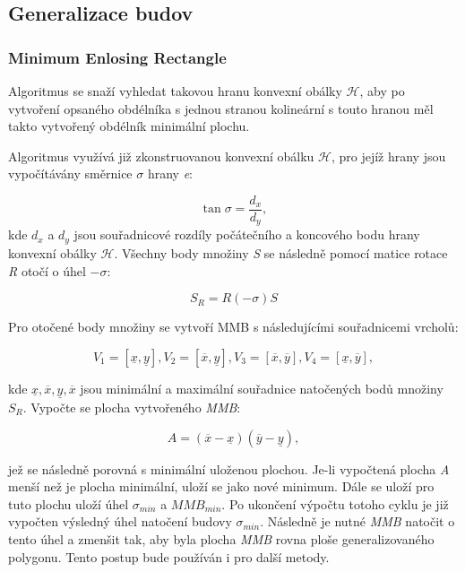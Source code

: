 \documentclass[11pt]{article}
\begin{document}
	
	\subsection{Generalizace budov}
	\subsubsection{Minimum Enlosing Rectangle}
	Algoritmus se snaží vyhledat takovou hranu konvexní obálky $\mathcal{H}$, aby po vytvoření opsaného obdélníka s jednou stranou kolineární s touto hranou měl takto vytvořený obdélník minimální plochu.
	
	Algoritmus využívá již zkonstruovanou konvexní obálku $\mathcal{H}$, pro jejíž hrany jsou vypočítávány směrnice $\sigma$ hrany \textit{e}: 
	
	\begin{equation}
		\tan\sigma=\frac{d_x}{d_y}, 
	\end{equation}
	kde $d_{x}$ a $d_{y}$ jsou souřadnicové rozdíly počátečního a koncového bodu hrany konvexní obálky $\mathcal{H}$. Všechny body množiny \textit{S} se následně pomocí matice rotace \textit{R} otočí o úhel $-\sigma$:
	
	\begin{equation}
		S_R=R(-\sigma)S 
	\end{equation}

	Pro otočené body množiny se vytvoří MMB s následujícími souřadnicemi vrcholů:
	
	\begin{equation}
		V_1 = [\underline{x}, \underline{y}], V_2 = [\overline{x}, \underline{y}],
		V_3 = [\overline{x}, \overline{y}],
		V_4 = [\underline{x}, \overline{y}],
	\end{equation}
	
	kde $\underline{x},\overline{x},\underline{y}, \overline{x}$ jsou minimální a maximální souřadnice natočených bodů množiny \textit{$ S_R $}. Vypočte se plocha vytvořeného \textit{MMB}:
	
	\begin{equation}
		A = (\overline{x}-\underline{x})(\overline{y}-\underline{y}),
	\end{equation}
	
	jež se následně porovná s minimální uloženou plochou. Je-li vypočtená plocha \textit{A} menší než je plocha minimální, uloží se jako nové minimum. Dále se uloží pro tuto plochu uloží úhel $ \sigma_{min} $ a \textit{$MMB_{min}$}. Po ukončení výpočtu 
	totoho cyklu je již vypočten výsledný úhel natočení budovy $ \sigma_{min} $. Následně je nutné \textit{MMB} natočit o tento úhel a zmenšit tak, aby byla plocha \textit{MMB} rovna ploše generalizovaného polygonu. Tento postup bude používán i pro další metody.
	
\end{document}
